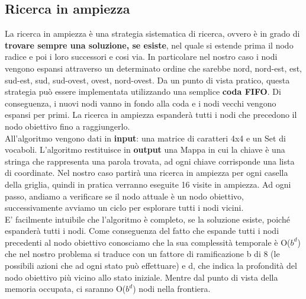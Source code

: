 \documentclass[10pt,a4paper]{article}
\begin{document}
	\subsection{Ricerca in ampiezza}
	La ricerca in ampiezza è una strategia sistematica di ricerca, ovvero è in grado di \textbf{trovare	sempre una soluzione, se esiste}, nel quale si estende prima il nodo radice e poi i loro successori	e cosi via. In particolare nel nostro caso i nodi vengono espansi attraverso un determinato ordine che sarebbe nord, nord-est, est, sud-est, sud, sud-ovest, ovest, nord-ovest.
	Da un punto di vista pratico, questa strategia può essere implementata utilizzando una semplice \textbf{coda FIFO}. Di conseguenza, i nuovi nodi vanno in fondo alla coda e i nodi vecchi vengono espansi per primi. La ricerca in ampiezza espanderà tutti i nodi che precedono il nodo obiettivo fino a raggiungerlo.\\
	All'algoritmo vengono dati in \textbf{input}: una matrice di caratteri 4x4 e un Set di vocaboli. L'algoritmo restituisce in \textbf{output} una Mappa in cui la chiave è una stringa che rappresenta una parola trovata, ad ogni chiave corrisponde una lista di coordinate.
	Nel nostro caso partirà una ricerca in ampiezza per ogni casella della griglia, quindi in pratica verranno eseguite 16 visite in ampiezza.
	Ad ogni passo, andiamo a verificare se il nodo attuale è un nodo obiettivo, successivamente avviamo un ciclo per esplorare tutti i nodi vicini.\\
	E’ facilmente intuibile che l’algoritmo è completo, se la soluzione esiste, poiché espanderà tutti i nodi.
	Come conseguenza del fatto che espande tutti i nodi precedenti al nodo obiettivo conosciamo che la sua complessità temporale è O($b^d$) che nel nostro problema si traduce con un fattore di ramificazione b di 8 (le possibili azioni che ad ogni stato può effettuare) e d, che indica la profondità del nodo obiettivo più vicino allo stato iniziale. Mentre dal punto di vista della memoria occupata, ci saranno O($b^d$) nodi nella frontiera.
\end{document}
